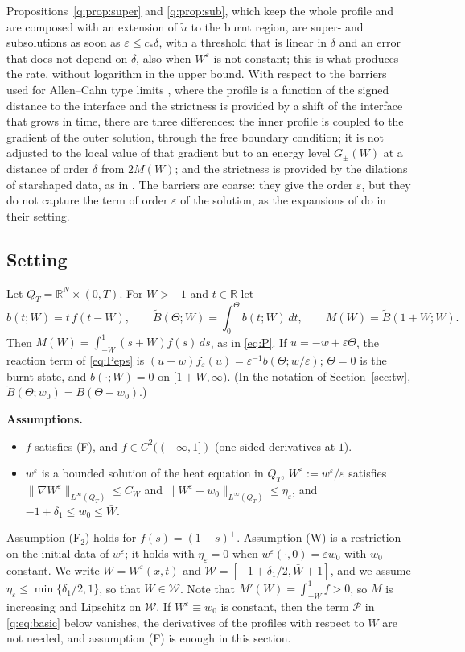 \documentclass[11pt]{amsart}
\theoremstyle{definition}
\theoremstyle{remark}
\newcommand{\ve}{\varepsilon}
\newcommand{\R}{\mathbb{R}}
\begin{document}
Propositions~\ref{q:prop:super} and \ref{q:prop:sub}, which keep the whole profile and
are composed with an extension of $\tilde u$ to the burnt region, are super- and
subsolutions as soon
as $\ve\le c_*\delta$, with a threshold that is linear in $\delta$ and an error that does
not depend on $\delta$, also when $W^\ve$ is not constant; this is what
produces the rate, without logarithm in the upper bound. With respect to the barriers used
for Allen--Cahn type limits \cite{Chen1992,DeMottoniSchatzman1995,AlfaroHilhorstMatano2008},
where the profile is a function of the signed distance to the interface and the
strictness is provided by a shift of the interface that grows in time, there are three
differences: the inner profile is coupled to the gradient of the outer solution, through
the free boundary condition; it is not adjusted to the local value of that gradient but
to an energy level $G_\pm(W)$ at a distance of order $\delta$ from $2M(W)$; and the
strictness is provided by the dilations of starshaped data, as in
\cite{FernandezBonderWolanski2004}. The barriers are coarse: they give the order $\ve$,
but they do not capture the term of order $\ve$ of the solution, as the expansions of
\cite{DeMottoniSchatzman1995} do in their setting.

\subsection{Setting}
Let $Q_T=\R^N\times(0,T)$. For $W>-1$ and $t\in\R$ let
\[
b(t;W)=t\,f(t-W),\qquad \tilde B(\Theta;W)=\int_0^\Theta b(t;W)\,dt,\qquad
M(W)=\tilde B(1+W;W) .
\]
Then $M(W)=\int_{-W}^1(s+W)f(s)\,ds$, as in \eqref{eq:P}.
If $u=-w+\ve\Theta$, the reaction term of \eqref{eq:Peps} is
$(u+w)f_\ve(u)=\ve^{-1}b(\Theta;w/\ve)$; $\Theta=0$ is the burnt state, and
$b(\cdot;W)=0$ on $[1+W,\infty)$. (In the notation of Section~\ref{sec:tw},
$\tilde B(\Theta;w_0)=B(\Theta-w_0)$.)

\textbf{Assumptions.}
\begin{itemize}
\item[(F$_2$)] $f$ satisfies (F), and $f\in C^2((-\infty,1])$ (one-sided derivatives at $1$).
\item[(W)] $w^\ve$ is a bounded solution of the heat equation in $Q_T$,
$W^\ve:=w^\ve/\ve$ satisfies $\|\nabla W^\ve\|_{L^\infty(Q_T)}\le C_W$ and
$\|W^\ve-w_0\|_{L^\infty(Q_T)}\le\eta_\ve$, and $-1+\delta_1\le w_0\le \bar W$.
\end{itemize}
Assumption (F$_2$) holds for $f(s)=(1-s)^+$. Assumption (W) is a restriction on
the initial data of $w^\ve$; it holds with $\eta_\ve=0$ when $w^\ve(\cdot,0)=\ve w_0$ with
$w_0$ constant. We write $W=W^\ve(x,t)$ and
$\mathcal W=[-1+\delta_1/2,\bar W+1]$, and we assume $\eta_\ve\le\min\{\delta_1/2,1\}$, so that
$W\in\mathcal W$. Note that
$M'(W)=\int_{-W}^1f>0$, so $M$ is increasing and Lipschitz on $\mathcal W$. If
$W^\ve\equiv w_0$ is constant, then the term $\mathcal P$ in \eqref{q:eq:basic} below
vanishes, the derivatives of the profiles with respect to $W$ are not needed, and
assumption (F) is enough in this section.
\end{document}
